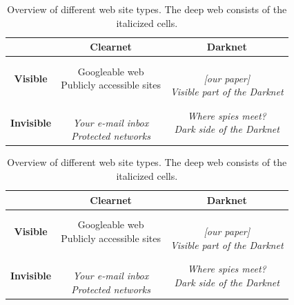 
\ifdgruyter
  \begin{table}[h!]
    \begin{center}
      \caption{Overview of different web site types. The deep web consists of the italicized cells.}
      \label{tab:overview}
      \begin{tabular}{c|c | c }
        & \textbf{Clearnet} & \textbf{Darknet}\\
        \hline
        \hline
        \textbf{Visible}&
        \shortstack[c]{Googleable web \\ Publicly accessible sites} & 
        \shortstack[c]{\\[1pt] \textit{[our paper]} \\ \textit{Visible part of the Darknet}}\\
        \hline
        \textbf{Invisible}&
        \shortstack[c]{\\[1pt] \textit{Your e-mail inbox} \\ \textit{Protected networks}} & 
        \shortstack[c]{\textit{Where spies meet?} \\ \textit{Dark side of the Darknet}}\\
      \end{tabular}
    \end{center}
  \end{table}
\fi

\iflncs
  \begin{table}[h!]
    \begin{center}
      \begin{tabular}{c|c | c }
        \hline
        & \textbf{Clearnet} & \textbf{Darknet}\\
        \hline
        \hline
        \textbf{Visible}&
        \shortstack[c]{Googleable web \\ Publicly accessible sites} & 
        \shortstack[c]{\\[1pt] \textit{[our paper]} \\ \textit{Visible part of the Darknet}}\\
        \hline
        \textbf{Invisible}&
        \shortstack[c]{\\[1pt] \textit{Your e-mail inbox} \\ \textit{Protected networks}} & 
        \shortstack[c]{\textit{Where spies meet?} \\ \textit{Dark side of the Darknet}}\\
        \hline
      \end{tabular}
      \vspace{10pt}
      \caption{Overview of different web site types. The deep web consists of the italicized cells.}
      \label{tab:overview}
    \end{center}
  \end{table}
\fi

